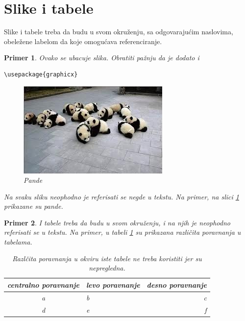 \documentclass[a4paper]{article}
\newtheorem{primer}{Primer}[section]
\begin{document}
\section{Slike i tabele}
\label{slike_i_tabele}

Slike i tabele treba da budu u svom okruženju, sa odgovarajućim naslovima, obeležene labelom da koje omogućava referenciranje. 

\begin{primer} Ovako se ubacuje slika. Obratiti pažnju da je dodato i 
\begin{verbatim}
\usepackage{graphicx}
\end{verbatim}

\begin{figure}[h!]
\begin{center}
\includegraphics[scale=0.75]{panda.jpg}
\end{center}
\caption{Pande}
\label{fig:pande}
\end{figure}

Na svaku sliku neophodno je referisati se negde u tekstu. Na primer, na slici \ref{fig:pande} prikazane su pande. 
\end{primer}

\begin{primer} I tabele treba da budu u svom okruženju, i na njih je neophodno referisati se u tekstu. Na primer, u tabeli \ref{tab:tabela1} su prikazana različita poravnanja u tabelama.

\begin{table}[h!]
\begin{center}
\caption{Razlčita poravnanja u okviru iste tabele ne treba koristiti jer su nepregledna.}
\begin{tabular}{|c|l|r|} \hline
centralno poravnanje& levo poravnanje& desno poravnanje\\ \hline
a &b&c\\ \hline
d &e&f\\ \hline
\end{tabular}
\label{tab:tabela1}
\end{center}
\end{table}

\end{primer}
\end{document}
